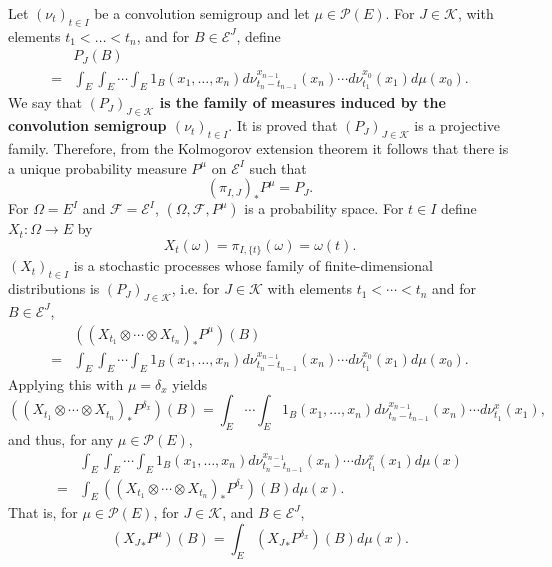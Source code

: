 \documentclass{article}
\theoremstyle{definition}
\begin{document}
Let $(\nu_t)_{t  \in I}$ be a convolution semigroup and let $\mu \in \mathscr{P}(E)$.
For $J \in \mathscr{K}$, with elements $t_1<\ldots<t_n$, and for $B \in \mathscr{E}^J$,
define
\begin{equation}
\begin{split}
&P_J(B)\\
=&\int_E \int_E \cdots \int_E 1_B(x_1,\ldots,x_n)
d\nu_{t_n-t_{n-1}}^{x_{n-1}}(x_n) \cdots d\nu_{t_1}^{x_0} (x_1) d\mu(x_0).
\end{split}
\label{PJ}
\end{equation}
We say that \textbf{$(P_J)_{J \in \mathscr{K}}$ is the family of measures induced by the convolution semigroup
$(\nu_t)_{t \in I}$}.
It is proved that $(P_J)_{J \in \mathscr{K}}$ is a projective family. Therefore, from the Kolmogorov extension theorem it follows that there is a unique probability measure $P^\mu$ on
$\mathscr{E}^I$ such that 
\begin{equation}
(\pi_{I,J})_* P^\mu = P_J.
\label{376}
\end{equation}
For  $\Omega=E^I$ and $\mathscr{F}=\mathscr{E}^I$, 
$(\Omega,\mathscr{F},P^\mu)$ is a probability space.
For $t \in I$ define $X_t:\Omega \to E$ by
\[
X_t(\omega)=\pi_{I,\{t\}}(\omega) = \omega(t). 
\]
$(X_t)_{t \in I}$ is a stochastic processes whose family of finite-dimensional distributions is
$(P_J)_{J \in \mathscr{K}}$, i.e.
for $J \in \mathscr{K}$ with elements $t_1<\cdots<t_n$ and for $B \in \mathscr{E}^J$,
\[
\begin{split}
&((X_{t_1} \otimes \cdots \otimes X_{t_n})_*P^\mu)(B)\\
=&\int_E \int_E \cdots \int_E 1_B(x_1,\ldots,x_n)
d\nu_{t_n-t_{n-1}}^{x_{n-1}}(x_n) \cdots d\nu_{t_1}^{x_0} (x_1) d\mu(x_0).
\end{split}
\]
Applying this with $\mu=\delta_x$ yields
\[
((X_{t_1} \otimes \cdots \otimes X_{t_n})_*P^{\delta_x})(B)
=\int_E \cdots \int_E  1_B(x_1,\ldots,x_n) d\nu_{t_n-t_{n-1}}^{x_{n-1}}(x_n) \cdots d\nu_{t_1}^{x} (x_1),
\]
and thus, for any $\mu \in \mathscr{P}(E)$,
\[
\begin{split}
&\int_E \int_E \cdots \int_E  1_B(x_1,\ldots,x_n) d\nu_{t_n-t_{n-1}}^{x_{n-1}}(x_n) \cdots d\nu_{t_1}^{x} (x_1) d\mu(x)\\
=&\int_E ((X_{t_1} \otimes \cdots \otimes X_{t_n})_*P^{\delta_x})(B) d\mu(x).
\end{split}
\]
That is, for $\mu \in \mathscr{P}(E)$,
for $J \in \mathscr{K}$, and $B \in \mathscr{E}^J$,
\begin{equation}
({X_J}_*P^{\mu})(B) = \int_E ({X_J}_*P^{\delta_x})(B)d\mu(x).
\label{3621}
\end{equation}
\end{document}
